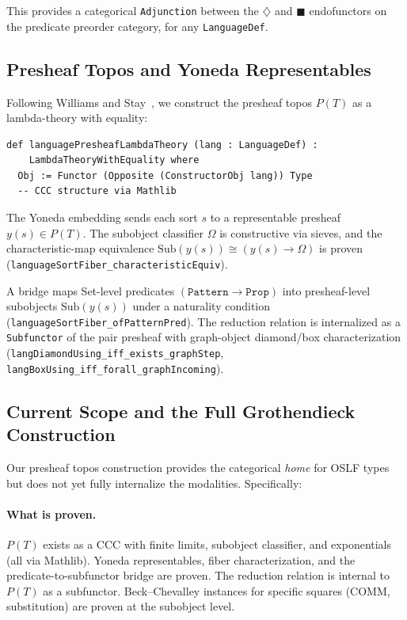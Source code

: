 \documentclass[]{article}
\newcommand{\code}[1]{\texttt{#1}}
\newcommand{\Dia}{\ensuremath{\diamondsuit}}
\newcommand{\Bx}{\ensuremath{\blacksquare}}
\newcommand{\OSLF}{\textup{OSLF}}
\begin{document}
This provides a categorical \code{Adjunction} between the $\Dia$ and $\Bx$
endofunctors on the predicate preorder category, for any \code{LanguageDef}.

\subsection{Presheaf Topos and Yoneda Representables}

Following Williams and Stay~\cite{WilliamsStay2021}, we construct the presheaf
topos $P(T)$ as a lambda-theory with equality:

\begin{lstlisting}[caption={Presheaf topos (CategoryBridge.lean)}]
def languagePresheafLambdaTheory (lang : LanguageDef) :
    LambdaTheoryWithEquality where
  Obj := Functor (Opposite (ConstructorObj lang)) Type
  -- CCC structure via Mathlib
\end{lstlisting}

The Yoneda embedding sends each sort $s$ to a representable presheaf
$y(s) \in P(T)$.  The subobject classifier $\Omega$ is constructive via
sieves, and the characteristic-map equivalence
$\mathrm{Sub}(y(s)) \cong (y(s) \to \Omega)$
is proven (\code{languageSortFiber\_characteristicEquiv}).

A bridge maps Set-level predicates $(\mathtt{Pattern} \to \mathtt{Prop})$
into presheaf-level subobjects $\mathrm{Sub}(y(s))$ under a naturality
condition (\code{languageSortFiber\_ofPatternPred}).  The reduction relation
is internalized as a \code{Subfunctor} of the pair presheaf with
graph-object diamond/box characterization
(\code{langDiamondUsing\_iff\_exists\_graphStep},
\code{langBoxUsing\_iff\_forall\_graphIncoming}).

\subsection{Current Scope and the Full Grothendieck Construction}
\label{sec:topos-scope}

Our presheaf topos construction provides the categorical \emph{home} for
\OSLF{} types but does not yet fully internalize the modalities.  Specifically:

\paragraph{What is proven.}
$P(T)$ exists as a CCC with finite limits, subobject classifier, and
exponentials (all via Mathlib).  Yoneda representables, fiber characterization,
and the predicate-to-subfunctor bridge are proven.  The reduction relation is
internal to $P(T)$ as a subfunctor.  Beck--Chevalley instances for specific
squares (COMM, substitution) are proven at the subobject level.
\end{document}

